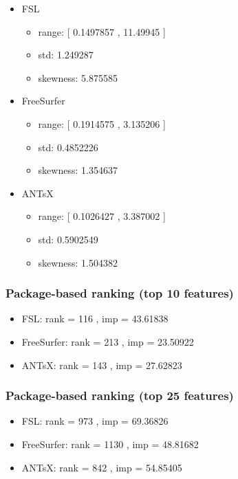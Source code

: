 \documentclass[
  10pt,
]{article}
\begin{document}
\begin{itemize}
\item
  FSL

  \begin{itemize}
  \item
    range: {[} 0.1497857 , 11.49945 {]}
  \item
    std: 1.249287
  \item
    skewness: 5.875585
  \end{itemize}
\item
  FreeSurfer

  \begin{itemize}
  \item
    range: {[} 0.1914575 , 3.135206 {]}
  \item
    std: 0.4852226
  \item
    skewness: 1.354637
  \end{itemize}
\item
  ANTsX

  \begin{itemize}
  \item
    range: {[} 0.1026427 , 3.387002 {]}
  \item
    std: 0.5902549
  \item
    skewness: 1.504382
  \end{itemize}
\end{itemize}

\hypertarget{package-based-ranking-top-10-features-2}{%
\subsubsection{Package-based ranking (top 10
features)}\label{package-based-ranking-top-10-features-2}}

\begin{itemize}
\item
  FSL: rank = 116 , imp = 43.61838
\item
  FreeSurfer: rank = 213 , imp = 23.50922
\item
  ANTsX: rank = 143 , imp = 27.62823
\end{itemize}

\hypertarget{package-based-ranking-top-25-features-2}{%
\subsubsection{Package-based ranking (top 25
features)}\label{package-based-ranking-top-25-features-2}}

\begin{itemize}
\item
  FSL: rank = 973 , imp = 69.36826
\item
  FreeSurfer: rank = 1130 , imp = 48.81682
\item
  ANTsX: rank = 842 , imp = 54.85405
\end{itemize}
\end{document}
